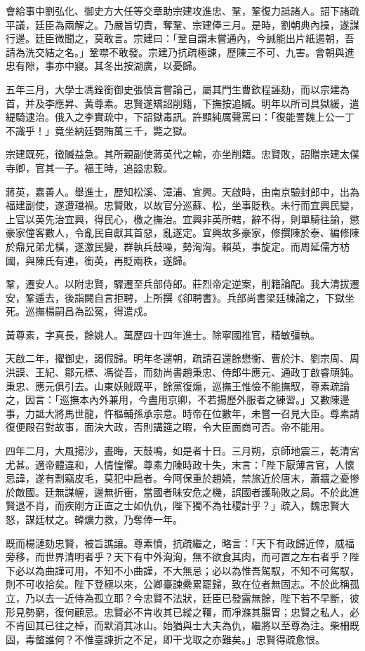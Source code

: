 \begin{pinyinscope}
會給事中劉弘化、御史方大任等交章助宗建攻進忠、鞏，鞏復力詆諸人。詔下諸疏平議，廷臣為兩解之。乃嚴旨切責，奪鞏、宗建俸三月。是時，劉朝典內操，遂謀行邊。廷臣微聞之，莫敢言。宗建曰：「鞏自謂未嘗通內，今誠能出片紙遏朝，吾請為洗交結之名。」鞏噤不敢發。宗建乃抗疏極諫，歷陳三不可、九害。會朝與進忠有隙，事亦中寢。其冬出按湖廣，以憂歸。

五年三月，大學士馮銓銜御史張慎言嘗論己，屬其門生曹欽程誣劾，而以宗建為首，并及李應昇、黃尊素。忠賢遂矯詔削籍，下撫按追贓。明年以所司具獄緩，遣緹騎逮治。俄入之李實疏中，下詔獄毒訊。許顯純厲聲罵曰：「復能詈魏上公一丁不識乎！」竟坐納廷弼賄萬三千，斃之獄。

宗建既死，徵贓益急。其所親副使蔣英代之輸，亦坐削籍。忠賢敗，詔贈宗建太僕寺卿，官其一子。福王時，追謚忠毅。

蔣英，嘉善人。舉進士，歷知松溪、漳浦、宜興。天啟時，由南京驗封郎中，出為福建副使，遂遭璫禍。忠賢敗，以故官分巡蘇、松，坐事貶秩。未行而宜興民變，上官以英先治宜興，得民心，檄之撫治。宜興非英所轄，辭不得，則單騎往諭，懲豪家僮客數人，令亂民自獻其首惡，亂遂定。宜興故多豪家，修撰陳於泰、編修陳於鼎兄弟尤橫，遂激民變，群執兵鼓噪，勢洶洶。賴英，事旋定。而周延儒方枋國，與陳氏有連，銜英，再貶兩秩，遂歸。

鞏，遷安人。以附忠賢，驟遷至兵部侍郎。莊烈帝定逆案，削籍論配。我大清拔遷安，鞏遁去，後詣闕自言拒聘，上所撰《卻聘書》。兵部尚書梁廷棟論之，下獄坐死。巡撫楊嗣昌為訟冤，得遣戍。

黃尊素，字真長，餘姚人。萬歷四十四年進士。除寧國推官，精敏彊執。

天啟二年，擢御史，謁假歸。明年冬還朝，疏請召還餘懋衡、曹於汴、劉宗周、周洪謨、王紀、鄒元標、馮從吾，而劾尚書趙秉忠、侍郎牛應元、通政丁啟睿頑鈍。秉忠、應元俱引去。山東妖賊既平，餘黨復煽，巡撫王惟儉不能撫馭，尊素疏論之，因言：「巡撫本內外兼用，今盡用京卿，不若揚歷外服者之練習。」又數陳邊事，力詆大將馬世龍，忤樞輔孫承宗意。時帝在位數年，未嘗一召見大臣。尊素請復便殿召對故事，面決大政，否則講筵之暇，令大臣面商可否。帝不能用。

四年二月，大風揚沙，晝晦，天鼓鳴，如是者十日。三月朔，京師地震三，乾清宮尤甚。適帝體違和，人情惶懼。尊素力陳時政十失，末言：「陛下厭薄言官，人懷忌諱，遂有剽竊皮毛，莫犯中扃者。今阿保重於趙嬈，禁旅近於唐末，蕭牆之憂慘於敵國。廷無謀幄，邊無折衝，當國者昧安危之機，誤國者護恥敗之局。不於此進賢退不肖，而疾剛方正直之士如仇仇，陛下獨不為社稷計乎？」疏入，魏忠賢大怒，謀廷杖之。韓爌力救，乃奪俸一年。

既而楊漣劾忠賢，被旨譙讓。尊素憤，抗疏繼之，略言：「天下有政歸近倖，威福旁移，而世界清明者乎？天下有中外洶洶，無不欲食其肉，而可置之左右者乎？陛下必以為曲謹可用，不知不小曲謹，不大無忌；必以為惟吾駕馭，不知不可駕馭，則不可收拾矣。陛下登極以來，公卿臺諫纍累罷歸，致在位者無固志。不於此稱孤立，乃以去一近侍為孤立耶？今忠賢不法狀，廷臣已發露無餘，陛下若不早斷，彼形見勢窮，復何顧忌。忠賢必不肯收其已縱之韁，而凈滌其腸胃；忠賢之私人，必不肯回其已往之棹，而默消其冰山。始猶與士大夫為仇，繼將以至尊為注。柴柵既固，毒螫誰何？不惟臺諫折之不足，即干戈取之亦難矣。」忠賢得疏愈恨。


\end{pinyinscope}
